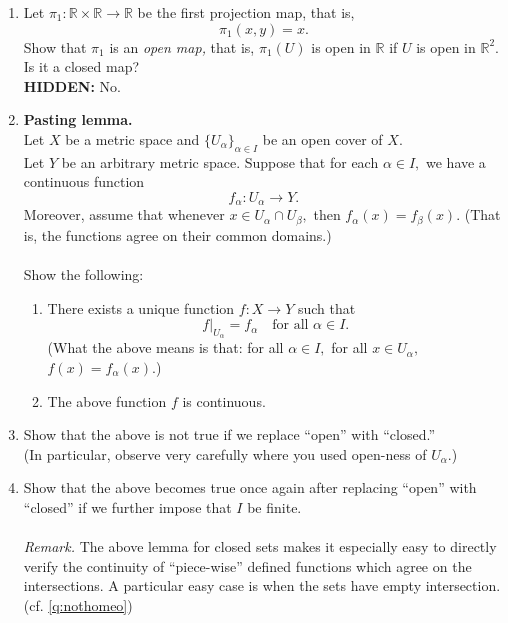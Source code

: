 \documentclass[12pt]{article}
\theoremstyle{definition}
\numberwithin{thm}{section}
\newcommand{\hint}[1]{\textbf{HIDDEN:} {\color[rgb]{0.95, 0.95, 0.95}#1}}
\begin{document}
\begin{enumerate}
	\item Let $\pi_1:\mathbb{R} \times \mathbb{R} \to \mathbb{R}$ be the first projection map, that is,
	\begin{equation*} 
		\pi_1(x, y) = x.
	\end{equation*}
	Show that $\pi_1$ is an \emph{open map,} that is, $\pi_1(U)$ is open in $\mathbb{R}$ if $U$ is open in $\mathbb{R}^2.$\\
	Is it a closed map?\\
	\hint{No.}
	\item \textbf{Pasting lemma.}\\
	Let $X$ be a metric space and $\{U_\alpha\}_{\alpha \in I}$ be an open cover of $X.$\\
	Let $Y$ be an arbitrary metric space. Suppose that for each $\alpha \in I,$ we have a continuous function
	\begin{equation*} 
		f_\alpha:U_\alpha \to Y.
	\end{equation*}
	Moreover, assume that whenever $x \in U_\alpha \cap U_\beta,$ then $f_\alpha(x) = f_\beta(x).$ (That is, the functions agree on their common domains.)\\~\\
	Show the following:
	\begin{enumerate}
		\item There exists a unique function $f:X \to Y$ such that 
		\begin{equation*} 
			f|_{U_\alpha} = f_\alpha \quad \text{for all } \alpha \in I.
		\end{equation*}
		(What the above means is that: for all $\alpha \in I,$ for all $x \in U_\alpha,$ $f(x) = f_\alpha(x).$)
		\item The above function $f$ is continuous.
	\end{enumerate}
	\item Show that the above is not true if we replace ``open'' with ``closed.'' \\
	(In particular, observe very carefully where you used open-ness of $U_\alpha.$)
	\item Show that the above becomes true once again after replacing ``open'' with ``closed'' if we further impose that $I$ be finite.\\~\\
	\emph{Remark.} The above lemma for closed sets makes it especially easy to directly verify the continuity of ``piece-wise'' defined functions which agree on the intersections. A particular easy case is when the sets have empty intersection. (cf. \ref{q:nothomeo})

\end{enumerate}
\end{document}
